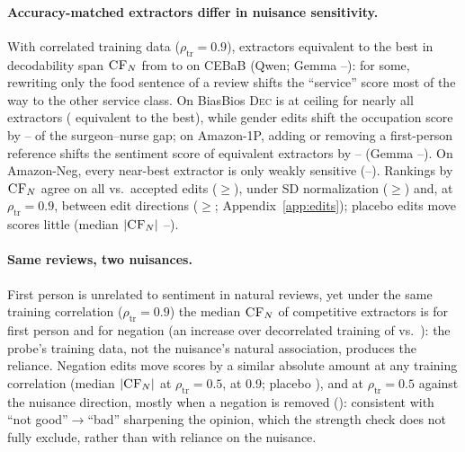 \documentclass[11pt]{article}
\newcommand{\rhot}{\rho_{\text{tr}}}
\newcommand{\dec}{\textsc{Dec}}
\newcommand{\cfn}{\textsc{CF}_{N}}
\begin{document}
\paragraph{Accuracy-matched extractors differ in nuisance sensitivity.} With correlated training data ($\rhot=0.9$), extractors equivalent to the best in decodability span $\cfn$ from \eqCFmincebabQNine{} to \eqCFmaxcebabQNine{} on CEBaB (Qwen; Gemma \eqCFmincebabGNine--\eqCFmaxcebabGNine): for some, rewriting only the food sentence of a review shifts the ``service'' score most of the way to the other service class. On BiasBios \dec{} is at ceiling for nearly all extractors (\eqNbiosQNine{} equivalent to the best), while gender edits shift the occupation score by \eqCFminbiosQNine--\eqCFmaxbiosQNine{} of the surgeon--nurse gap; on Amazon-1P, adding or removing a first-person reference shifts the sentiment score of equivalent extractors by \eqCFminamzfpQNine--\eqCFmaxamzfpQNine{} (Gemma \eqCFminamzfpGNine--\eqCFmaxamzfpGNine). On Amazon-Neg, every near-best extractor is only weakly sensitive (\nbCFminamznegQNine--\nbCFmaxamznegQNine). Rankings by $\cfn$ agree on all vs.\ accepted edits ($\geq$\robAllValMin), under SD normalization ($\geq$\robSDMin) and, at $\rhot=0.9$, between edit directions ($\geq$\robDirMinNine; Appendix~\ref{app:edits}); placebo edits move scores little (median $|\cfn|$ \placeboMin--\placeboMax).

\paragraph{Same reviews, two nuisances.} First person is unrelated to sentiment in natural reviews, yet under the same training correlation ($\rhot=0.9$) the median $\cfn$ of competitive extractors is \sgnamzfpNine{} for first person and \sgnamznegNine{} for negation (an increase over decorrelated training of \incamzfp{} vs.\ \incamzneg): the probe's training data, not the nuisance's natural association, produces the reliance. Negation edits move scores by a similar absolute amount at any training correlation (median $|\cfn|$ \absamznegFive{} at $\rhot=0.5$, \absamznegNine{} at 0.9; placebo \plcamznegNine), and at $\rhot=0.5$ against the nuisance direction, mostly when a negation is removed (\dirNegamznegFive): consistent with ``not good''$\to$``bad'' sharpening the opinion, which the strength check does not fully exclude, rather than with reliance on the nuisance.
\end{document}
